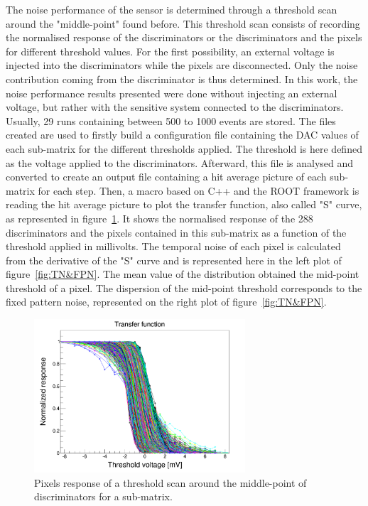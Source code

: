   The noise performance of the sensor is determined through a threshold scan around the "middle-point" found before.
  This threshold scan consists of recording the normalised response of the discriminators or the discriminators and the pixels for different threshold values.
  For the first possibility, an external voltage is injected into the discriminators while the pixels are disconnected.
  Only the noise contribution coming from the discriminator is thus determined.
  In this work, the noise performance results presented were done without injecting an external voltage, but rather with the sensitive system connected to the discriminators.
  Usually, 29 runs containing between 500 to 1000 events are stored.
  The files created are used to firstly build a configuration file containing the \gls{DAC} values of each sub-matrix for the different thresholds applied.
  The threshold is here defined as the voltage applied to the discriminators.
  Afterward, this file is analysed and converted to create an output file containing a hit average picture of each sub-matrix for each step.
  Then, a macro based on C++ and the ROOT framework is reading the hit average picture to plot the transfer function, also called "S" curve, as represented in figure~\ref{fig:transfer}.
  It shows the normalised response of the 288 discriminators and the pixels contained in this sub-matrix as a function of the threshold applied in millivolts.
  The temporal noise of each pixel is calculated from the derivative of the "S" curve and is represented here in the left plot of figure~\ref{fig:TN&FPN}.
  The mean value of the distribution obtained the mid-point threshold of a pixel.
  The dispersion of the mid-point threshold corresponds to the fixed pattern noise, represented on the right plot of figure~\ref{fig:TN&FPN}.
  
  \begin{figure}[!tbh]
    \centering
    \includegraphics[width=0.7\textwidth]{Pictures/labTests/transfer_B.png}
    \caption{Pixels response of a threshold scan around the middle-point of discriminators for a sub-matrix.}
    \label{fig:transfer}
  \end{figure}

